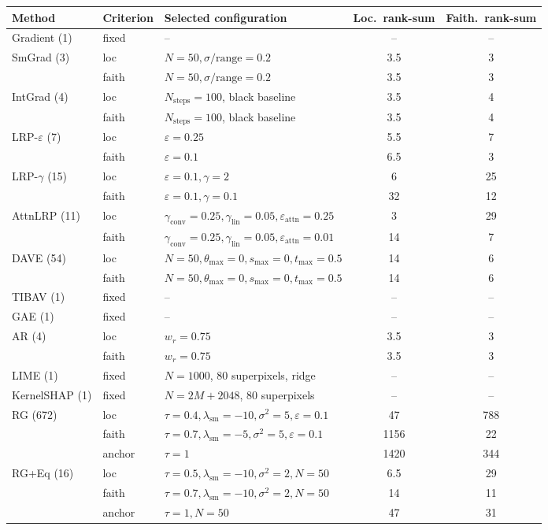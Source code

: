 \begin{tabular}{@{}l l l c c@{}}
\toprule
Method & Criterion & Selected configuration & Loc.\ rank-sum & Faith.\ rank-sum \\
\midrule
Gradient (1) & fixed & -- & -- & -- \\
\addlinespace
SmGrad (3) & loc & $N{=}50,\sigma/\mathrm{range}{=}0.2$ & 3.5 & 3 \\
 & faith & $N{=}50,\sigma/\mathrm{range}{=}0.2$ & 3.5 & 3 \\
\addlinespace
IntGrad (4) & loc & $N_{\mathrm{steps}}{=}100$, black baseline & 3.5 & 4 \\
 & faith & $N_{\mathrm{steps}}{=}100$, black baseline & 3.5 & 4 \\
\addlinespace
LRP-$\varepsilon$ (7) & loc & $\varepsilon{=}0.25$ & 5.5 & 7 \\
 & faith & $\varepsilon{=}0.1$ & 6.5 & 3 \\
\addlinespace
LRP-$\gamma$ (15) & loc & $\varepsilon{=}0.1,\gamma{=}2$ & 6 & 25 \\
 & faith & $\varepsilon{=}0.1,\gamma{=}0.1$ & 32 & 12 \\
\addlinespace
AttnLRP (11) & loc & $\gamma_{\mathrm{conv}}{=}0.25,\gamma_{\mathrm{lin}}{=}0.05,\varepsilon_{\mathrm{attn}}{=}0.25$ & 3 & 29 \\
 & faith & $\gamma_{\mathrm{conv}}{=}0.25,\gamma_{\mathrm{lin}}{=}0.05,\varepsilon_{\mathrm{attn}}{=}0.01$ & 14 & 7 \\
\addlinespace
DAVE (54) & loc & $N{=}50,\theta_{\max}{=}0,s_{\max}{=}0,t_{\max}{=}0.5$ & 14 & 6 \\
 & faith & $N{=}50,\theta_{\max}{=}0,s_{\max}{=}0,t_{\max}{=}0.5$ & 14 & 6 \\
\addlinespace
TIBAV (1) & fixed & -- & -- & -- \\
\addlinespace
GAE (1) & fixed & -- & -- & -- \\
\addlinespace
AR (4) & loc & $w_r{=}0.75$ & 3.5 & 3 \\
 & faith & $w_r{=}0.75$ & 3.5 & 3 \\
\addlinespace
LIME (1) & fixed & $N{=}1000$, 80 superpixels, ridge & -- & -- \\
\addlinespace
KernelSHAP (1) & fixed & $N{=}2M{+}2048$, 80 superpixels & -- & -- \\
\addlinespace
RG (672) & loc & $\tau{=}0.4,\lambda_{\mathrm{sm}}{=}{-}10,\sigma^2{=}5,\varepsilon{=}0.1$ & 47 & 788 \\
 & faith & $\tau{=}0.7,\lambda_{\mathrm{sm}}{=}{-}5,\sigma^2{=}5,\varepsilon{=}0.1$ & 1156 & 22 \\
 & anchor & $\tau{=}1$ & 1420 & 344 \\
\addlinespace
RG+Eq (16) & loc & $\tau{=}0.5,\lambda_{\mathrm{sm}}{=}{-}10,\sigma^2{=}2,N{=}50$ & 6.5 & 29 \\
 & faith & $\tau{=}0.7,\lambda_{\mathrm{sm}}{=}{-}10,\sigma^2{=}2,N{=}50$ & 14 & 11 \\
 & anchor & $\tau{=}1,N{=}50$ & 47 & 31 \\
\bottomrule
\end{tabular}
